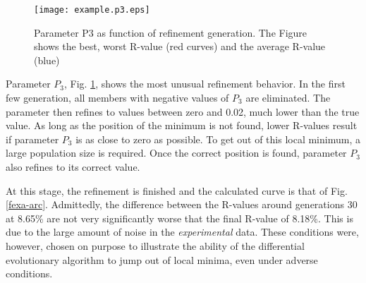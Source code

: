 \begin{figure}
   \texttt{[image: example.p3.eps]}
   \caption{Parameter P3 as function of refinement generation. The Figure
            shows the best, worst R-value (red curves) and the average
            R-value (blue)}
   \label{fexa-p3}
\end{figure}

Parameter $P_{3}$, Fig. \ref{fexa-p3}, shows the most unusual refinement 
behavior. In the 
first few generation, all members with negative values of $P_{3}$ are
eliminated. The parameter then refines to values between zero and 0.02,
much lower than the true value. As long as the position of the minimum
is not found, lower R-values result if parameter $P_{3}$ is as close
to zero as possible. To get out of this local minimum, a large 
population size is required. Once the correct position is found,
parameter $P_{3}$ also refines to its correct value.

At this stage, the refinement is finished and the calculated curve 
is that of Fig. \ref{fexa-arc}. Admittedly, the difference between
the R-values around generations 30 at 8.65\% are not very 
significantly worse that the final R-value of 8.18\%. This is due to
the large amount of noise in the {\em experimental} data. 
These conditions were, however, chosen on purpose to illustrate
the ability of the differential evolutionary algorithm to jump out
of local minima, even under adverse conditions.


